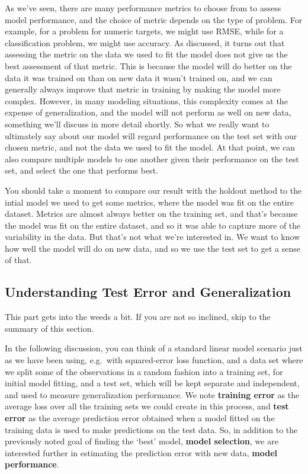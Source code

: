 \documentclass[
  letterpaper,
]{krantz}
\begin{document}
As we've seen, there are many performance metrics to choose from to
assess model performance, and the choice of metric depends on the type
of problem. For example, for a problem for numeric targets, we might use
RMSE, while for a classification problem, we might use accuracy. As
discussed, it turns out that assessing the metric on the data we used to
fit the model does not give us the best assessment of that metric. This
is because the model will do better on the data it was trained on than
on new data it wasn't trained on, and we can generally always improve
that metric in training by making the model more complex. However, in
many modeling situations, this complexity comes at the expense of
generalization, and the model will not perform as well on new data,
something we'll discuss in more detail shortly. So what we really want
to ultimately say about our model will regard performance on the test
set with our chosen metric, and not the data we used to fit the model.
At that point, we can also compare multiple models to one another given
their performance on the test set, and select the one that performs
best.

You should take a moment to compare our result with the holdout method
to the intial model we used to get some metrics, where the model was fit
on the entire dataset. Metrics are almost always better on the training
set, and that's because the model was fit on the entire dataset, and so
it was able to capture more of the variability in the data. But that's
not what we're interested in. We want to know how well the model will do
on new data, and so we use the test set to get a sense of that.

\subsection{Understanding Test Error and
Generalization}\label{understanding-test-error-and-generalization}

This part gets into the weeds a bit. If you are not so inclined, skip to
the summary of this section.

In the following discussion, you can think of a standard linear model
scenario just as we have been using, e.g.~with squared-error loss
function, and a data set where we split some of the observations in a
random fashion into a training set, for initial model fitting, and a
test set, which will be kept separate and independent, and used to
measure generalization performance. We note \textbf{training error} as
the average loss over all the training sets we could create in this
process, and \textbf{test error} as the average prediction error
obtained when a model fitted on the training data is used to make
predictions on the test data. So, in addition to the previously noted
goal of finding the `best' model, \textbf{model selection}, we are
interested further in estimating the prediction error with new data,
\textbf{model performance}.
\end{document}
